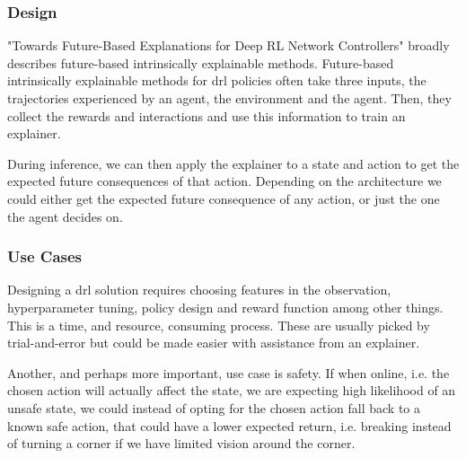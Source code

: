 \documentclass[UKenglish]{uiomasterthesis}
\begin{document}
\subsubsection{Design}
"Towards Future-Based Explanations for Deep RL Network Controllers"\cite{10.1145/3626570.3626607} broadly describes future-based intrinsically explainable methods. Future-based intrinsically explainable methods for \ac{drl} policies often take three inputs, the trajectories experienced by an agent, the environment and the agent. Then, they collect the rewards and interactions and use this information to train an explainer.

During inference, we can then apply the explainer to a state and action to get the expected future consequences of that action. Depending on the architecture we could either get the expected future consequence of any action, or just the one the agent decides on.

\subsubsection{Use Cases}

Designing a \ac{drl} solution requires choosing features in the observation,\\ hyperparameter tuning, policy design and reward function among other things. This is a time, and resource, consuming process. These are usually picked by trial-and-error but could be made easier with assistance from an explainer. %

Another, and perhaps more important, use case is safety. If when online, i.e. the chosen action will actually affect the state, we are expecting high likelihood of an unsafe state, we could instead of opting for the chosen action fall back to a known safe action, that could have a lower expected return, i.e. breaking instead of turning a corner if we have limited vision around the corner.

\end{document}
